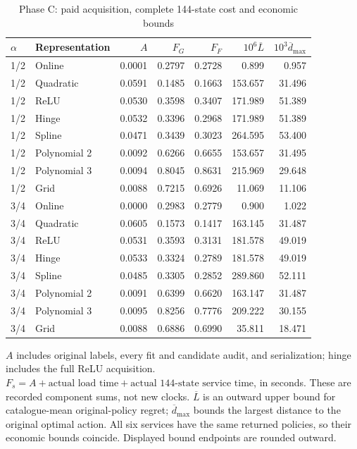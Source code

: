 \begin{table}[t]\centering\small
\caption{Phase C: paid acquisition, complete 144-state cost and economic bounds}
\label{tab:cost119c}
\begin{tabular}{llrrrrr}\toprule
$\alpha$ & Representation & $A$ & $F_G$ & $F_F$ & $10^6\overline L$ & $10^3\overline d_{\max}$\\\midrule
1/2 & Online & 0.0001 & 0.2797 & 0.2728 & 0.899 & 0.957 \\
1/2 & Quadratic & 0.0591 & 0.1485 & 0.1663 & 153.657 & 31.496 \\
1/2 & ReLU & 0.0530 & 0.3598 & 0.3407 & 171.989 & 51.389 \\
1/2 & Hinge & 0.0532 & 0.3396 & 0.2968 & 171.989 & 51.389 \\
1/2 & Spline & 0.0471 & 0.3439 & 0.3023 & 264.595 & 53.400 \\
1/2 & Polynomial 2 & 0.0092 & 0.6266 & 0.6655 & 153.657 & 31.495 \\
1/2 & Polynomial 3 & 0.0094 & 0.8045 & 0.8631 & 215.969 & 29.648 \\
1/2 & Grid & 0.0088 & 0.7215 & 0.6926 & 11.069 & 11.106 \\
3/4 & Online & 0.0000 & 0.2983 & 0.2779 & 0.900 & 1.022 \\
3/4 & Quadratic & 0.0605 & 0.1573 & 0.1417 & 163.145 & 31.487 \\
3/4 & ReLU & 0.0531 & 0.3593 & 0.3131 & 181.578 & 49.019 \\
3/4 & Hinge & 0.0533 & 0.3324 & 0.2789 & 181.578 & 49.019 \\
3/4 & Spline & 0.0485 & 0.3305 & 0.2852 & 289.860 & 52.111 \\
3/4 & Polynomial 2 & 0.0091 & 0.6399 & 0.6620 & 163.147 & 31.487 \\
3/4 & Polynomial 3 & 0.0095 & 0.8256 & 0.7776 & 209.222 & 30.155 \\
3/4 & Grid & 0.0088 & 0.6886 & 0.6990 & 35.811 & 18.471 \\
\bottomrule\end{tabular}
\par\smallskip\footnotesize
$A$ includes original labels, every fit and candidate audit, and serialization; hinge includes the full ReLU acquisition. $F_s=A+\text{actual load time}+\text{actual 144-state service time}$, in seconds. These are recorded component sums, not new clocks. $\overline L$ is an outward upper bound for catalogue-mean original-policy regret; $\overline d_{\max}$ bounds the largest distance to the original optimal action. All six services have the same returned policies, so their economic bounds coincide. Displayed bound endpoints are rounded outward.
\end{table}
